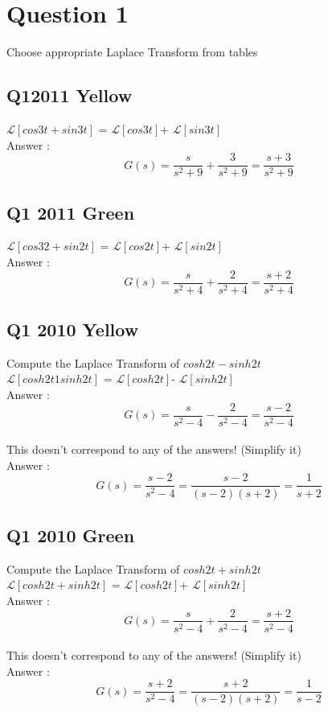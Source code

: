 \documentclass[11pt,a4paper,titlepage,oneside,openany]{article}
\numberwithin{equation}{section}
\numberwithin{algorithm}{section}
\numberwithin{figure}{section}
\numberwithin{table}{section}
\begin{document}
\section*{Question 1}
Choose appropriate Laplace Transform from tables
\subsection*{Q12011 Yellow}
$\mathcal{L}[cos3t + sin3t]$ = $\mathcal{L}[cos3t]$+ $\mathcal{L}[sin3t]$\\
Answer : \[ G(s) = \frac{s}{s^2+9}+\frac{3}{s^2+9}= \frac{s+3}{s^2+9}\]
\subsection*{Q1 2011 Green}
$\mathcal{L}[cos32 + sin2t]$ = $\mathcal{L}[cos2t]$+ $\mathcal{L}[sin2t]$ \\

Answer : \[ G(s) = \frac{s}{s^2+4}+\frac{2}{s^2+4}= \frac{s+2}{s^2+4}\]

\subsection*{Q1 2010 Yellow}
Compute the Laplace Transform of $cosh 2t - sinh 2t$\\
$\mathcal{L}[cosh2t 1 sinh2t]$ = $\mathcal{L}[cosh2t]$- $\mathcal{L}[sinh2t]$\\
Answer : \[ G(s) = \frac{s}{s^2-4}-\frac{2}{s^2-4}= \frac{s-2}{s^2-4}\]\\
This doesn't correspond to any of the answers! (Simplify it)\\
Answer : \[ G(s) = \frac{s-2}{s^2-4} = \frac{s-2}{(s-2)(s+2)} = \frac{1}{s+2}\]

\subsection*{Q1 2010 Green}


Compute the Laplace Transform of $cosh 2t + sinh 2t$\\
$\mathcal{L}[cosh2t + sinh2t]$ = $\mathcal{L}[cosh2t]$+ $\mathcal{L}[sinh2t]$\\
Answer : \[ G(s) = \frac{s}{s^2-4}+\frac{2}{s^2-4}= \frac{s+2}{s^2-4}\]\\
This doesn't correspond to any of the answers! (Simplify it)\\
Answer : \[ G(s) = \frac{s+2}{s^2-4} = \frac{s+2}{(s-2)(s+2)} = \frac{1}{s-2}\]
\newpage
\end{document}

